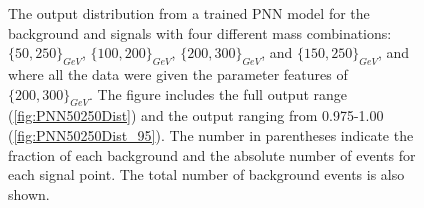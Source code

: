 \begin{figure}
    \caption[The output distribution from a trained \acs{PNN} model for the background and signals with four different mass combinations, where 
    all events are given the same parameter.]{
    The output distribution from a trained \ac{PNN} model for the background and signals with four different mass combinations:
    $\{50,250\}_{GeV}$, $\{100,200\}_{GeV}$, $\{200,300\}_{GeV}$, and $\{150,250\}_{GeV}$, and where all the data were given the 
    parameter features of $\{200,300\}_{GeV}$. The figure includes the full output range (\ref{fig:PNN50250Dist}) 
    and the output ranging from 0.975-1.00 (\ref{fig:PNN50250Dist_95}). The number in parentheses indicate the fraction of each background and 
    the absolute number of events for each signal point. The total number of background events is also shown.}
    \label{fig:PNN200300DistComp}
\end{figure}
